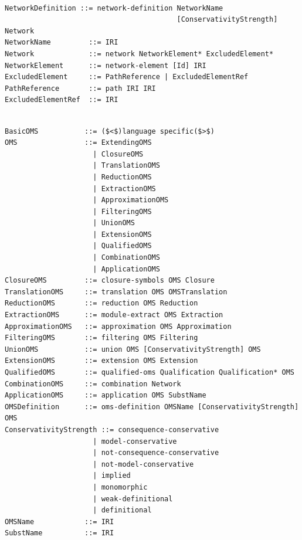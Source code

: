 \documentclass[10pt, a4paper]{isov2}
\begin{document}
\label{a:networks}
\begin{lstlisting}[language=ebnf,escapeinside={()}]  % abstract syntax

NetworkDefinition ::= network-definition NetworkName
                                         [ConservativityStrength] Network
NetworkName         ::= IRI
Network             ::= network NetworkElement* ExcludedElement*
NetworkElement      ::= network-element [Id] IRI
ExcludedElement     ::= PathReference | ExcludedElementRef
PathReference       ::= path IRI IRI
ExcludedElementRef  ::= IRI
\end{lstlisting}




\begin{lstlisting}[language=ebnf,escapeinside={()}]  % abstract syntax

BasicOMS           ::= ($<$)language specific($>$) 
OMS                ::= ExtendingOMS
                     | ClosureOMS
                     | TranslationOMS
                     | ReductionOMS
                     | ExtractionOMS
                     | ApproximationOMS
                     | FilteringOMS
                     | UnionOMS
                     | ExtensionOMS
                     | QualifiedOMS
                     | CombinationOMS
                     | ApplicationOMS
ClosureOMS         ::= closure-symbols OMS Closure
TranslationOMS     ::= translation OMS OMSTranslation
ReductionOMS       ::= reduction OMS Reduction
ExtractionOMS      ::= module-extract OMS Extraction
ApproximationOMS   ::= approximation OMS Approximation
FilteringOMS       ::= filtering OMS Filtering
UnionOMS           ::= union OMS [ConservativityStrength] OMS
ExtensionOMS       ::= extension OMS Extension
QualifiedOMS       ::= qualified-oms Qualification Qualification* OMS
CombinationOMS     ::= combination Network
ApplicationOMS     ::= application OMS SubstName
OMSDefinition      ::= oms-definition OMSName [ConservativityStrength] OMS
ConservativityStrength ::= consequence-conservative
                     | model-conservative
                     | not-consequence-conservative
                     | not-model-conservative
                     | implied
                     | monomorphic
                     | weak-definitional
                     | definitional
OMSName            ::= IRI
SubstName          ::= IRI
\end{lstlisting}
\end{document}

